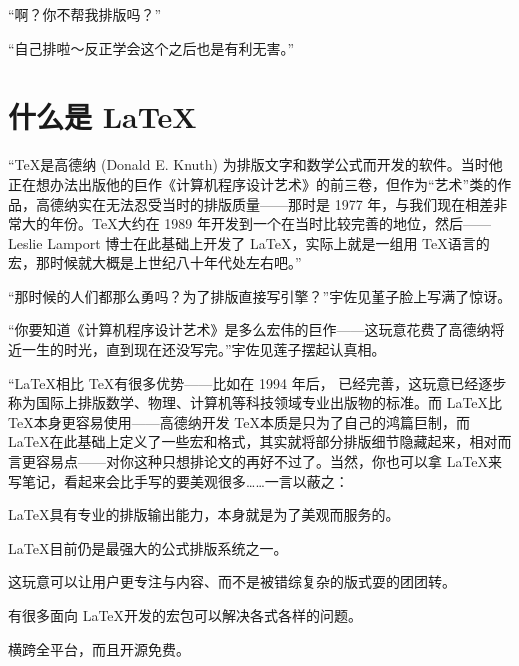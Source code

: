 “啊？你不帮我排版吗？”

“自己排啦～反正学会这个之后也是有利无害。”

\section{什么是 \LaTeX}

“\TeX 是高德纳 (Donald E. Knuth) 为排版文字和数学公式而开发的软件。当时他正在想办法出版他的巨作《计算机程序设计艺术》的前三卷，但作为“艺术”类的作品，高德纳实在无法忍受当时的排版质量——那时是 1977 年，与我们现在相差非常大的年份。\TeX 大约在 1989 年开发到一个在当时比较完善的地位，然后—— Leslie Lamport 博士在此基础上开发了 \LaTeX，实际上就是一组用 \TeX 语言的宏，那时候就大概是上世纪八十年代处左右吧。”

“那时候的人们都那么勇吗？为了排版直接写引擎？”宇佐见堇子脸上写满了惊讶。

“你要知道《计算机程序设计艺术》是多么宏伟的巨作——这玩意花费了高德纳将近一生的时光，直到现在还没写完。”宇佐见莲子摆起认真相。

“\LaTeX 相比 \TeX 有很多优势——比如在 1994 年后，\LaTeXe{} 已经完善，这玩意已经逐步称为国际上排版数学、物理、计算机等科技领域专业出版物的标准。而 \LaTeX 比 \TeX 本身更容易使用——高德纳开发 \TeX 本质是只为了自己的鸿篇巨制，而 \LaTeX 在此基础上定义了一些宏和格式，其实就将部分排版细节隐藏起来，相对而言更容易点——对你这种只想排论文的再好不过了。当然，你也可以拿 \LaTeX 来写笔记，看起来会比手写的要美观很多……一言以蔽之：

\begin{center}
    \begin{tcolorbox}[enhanced, breakable,
            colback = white!90!black, colframe = white!40!black, colbacktitle = cyan,
            boxsep=2mm, width=14cm,
            boxed title style = {sharp corners}]
        \begin{itemize}
            {\kaishu \item \LaTeX 具有专业的排版输出能力，本身就是为了美观而服务的。
            \item \LaTeX 目前仍是最强大的公式排版系统之一。
            \item 这玩意可以让用户更专注与内容、而不是被错综复杂的版式耍的团团转。%
            \item 有很多面向 \LaTeX 开发的宏包可以解决各式各样的问题。
            \item 横跨全平台，而且开源免费。}
        \end{itemize}
    \end{tcolorbox}
\end{center}

